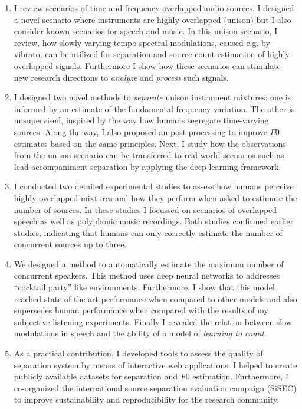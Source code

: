 \begin{enumerate}
\item I review scenarios of time and frequency overlapped audio sources.
I designed a novel scenario where instruments are highly overlapped (unison) but I also consider known scenarios for speech and music.
In this unison scenario, I review, how slowly varying tempo-spectral modulations, caused e.g. by vibrato, can be utilized for separation and source count estimation of highly overlapped signals.
Furthermore I show how these scenarios can stimulate new research directions to \emph{analyze} and \emph{process} such signals.

\item I designed two novel methods to \emph{separate} unison instrument mixtures: one is informed by an estimate of the fundamental frequency variation.
The other is unsupervised, inspired by the way how humans segregate time-varying sources.
Along the way, I also proposed an post-processing to improve \(F0\) estimates based on the same principles.
Next, I study how the observations from the unison scenario can be transferred to real world scenarios such as lead accompaniment separation by applying the deep learning framework.

\item I conducted two detailed experimental studies to assess how humans perceive highly overlapped mixtures and how they perform when asked to estimate the number of sources.
In these studies I focussed on scenarios of overlapped speech as well as polyphonic music recordings.
Both studies confirmed earlier studies, indicating that humans can only correctly estimate the number of concurrent sources up to three.

\item We designed a method to automatically estimate the maximum number of concurrent speakers. This method uses deep neural networks to addresses ``cocktail party'' like environments.
Furthermore, I show that this model reached state-of-the art performance when compared to other models and also supersedes human performance when compared with the results of my subjective listening experiments.
Finally I revealed the relation between slow modulations in speech and the ability of a model of \emph{learning to count}.

\item As a practical contribution, I developed tools to assess the quality of separation system by means of interactive web applications. 
I helped to create publicly available datasets for separation and \(F0\) estimation.
Furthermore, I  co-organized the international source separation evaluation campaign (SiSEC) to improve sustainability and reproducibility for the research community.
\end{enumerate}

